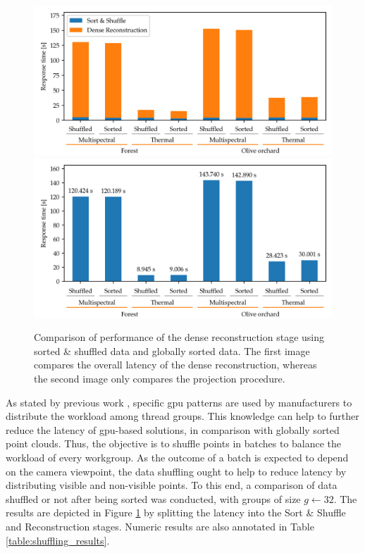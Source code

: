 \begin{figure}
\includegraphics[width=.75\linewidth]{figs/multi_thermal_projection/results/stacked_stage_response_time.png}
\includegraphics[width=.75\linewidth]{figs/multi_thermal_projection/results/shuffled_response_time.png}
\caption{Comparison of performance of the dense reconstruction stage using sorted \& shuffled data and globally sorted data. The first image compares the overall latency of the dense reconstruction, whereas the second image only compares the projection procedure.}
\label{fig:shuffle_comparison}
\end{figure}

As stated by previous work \cite{schutz_rendering_2021, kerbl_effective_2017}, specific \acrshort{gpu} patterns are used by manufacturers to distribute the workload among thread groups. This knowledge can help to further reduce the latency of \acrshort{gpu}-based solutions, in comparison with globally sorted point clouds. Thus, the objective is to shuffle points in batches to balance the workload of every workgroup. As the outcome of a batch is expected to depend on the camera viewpoint, the data shuffling ought to help to reduce latency by distributing visible and non-visible points. To this end, a comparison of data shuffled or not after being sorted was conducted, with groups of size $g \gets 32$. The results are depicted in Figure \ref{fig:shuffle_comparison} by splitting the latency into the Sort \& Shuffle and Reconstruction stages. Numeric results are also annotated in Table \ref{table:shuffling_results}.

